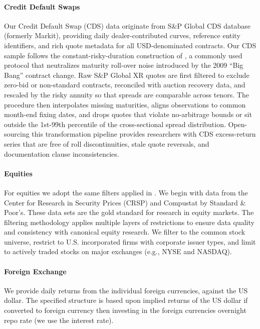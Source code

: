 \documentclass{article}
\begin{document}
\paragraph{Credit Default Swaps}
Our Credit Default Swap (CDS) data originate from S\&P Global CDS database (formerly Markit),
providing daily dealer-contributed curves, reference entity identifiers,
and rich quote metadata for all USD-denominated contracts.
Our CDS sample follows the constant-risky-duration construction of
\cite{Palhares2012}, a commonly used protocol that neutralizes maturity roll-over
noise introduced by the 2009 ``Big Bang'' contract change. Raw S\&P Global XR quotes
are first filtered to exclude zero-bid or non-standard contracts, reconciled
with auction recovery data, and rescaled by the risky annuity so that spreads
are comparable across tenors.  The procedure then interpolates missing
maturities, aligns observations to common month-end fixing dates, and drops quotes
that violate no-arbitrage bounds or sit outside the 1st-99th percentile of the
cross-sectional spread distribution. Open-sourcing this transformation pipeline
provides researchers with CDS excess-return series that are free of roll
discontinuities, stale quote reversals, and documentation clause
inconsistencies.

\paragraph{Equities}
For equities we adopt the same filters applied in \cite{Fama1993}. We begin with data from the Center for Research in Security Prices (CRSP) and Compustat by Standard \& Poor's. These data sets are the gold standard for research in equity markets. The filtering methodology applies multiple layers of restrictions to ensure data quality and consistency with canonical equity research. We filter to the common stock universe, restrict to U.S. incorporated firms with corporate issuer types, and limit to actively traded stocks on major exchanges (e.g., NYSE and NASDAQ).


\paragraph{Foreign Exchange}
We provide daily returns from the individual foreign currencies, against the US dollar.
The specified structure is based upon implied returns of the US dollar if converted to foreign currency then investing
in the foreign currencies overnight repo rate (we use the interest rate).
\end{document}
